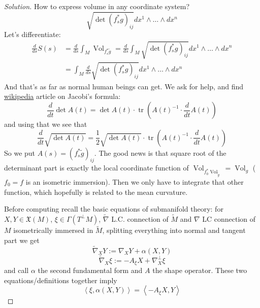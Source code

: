 \begin{proof}[Solution]\leavevmode
How to express volume in any coordinate system?
\[\sqrt{\det (f^* _sg)_{ij}}dx^1\wedge\ldots\wedge dx^n\]
Let's differentiate:
\begin{align*}
	\frac{d}{ds}S(s)&=\frac{d}{ds}\int_M\operatorname{Vol}_{f^*_s\tilde{g}}=\frac{d}{ds}\int_M \sqrt{\det (f^* _sg)_{ij}}dx^1\wedge\ldots\wedge dx^n\\
&=\int_M \frac{d}{ds}\sqrt{\det (f^* _sg)_{ij}}dx^1\wedge\ldots\wedge dx^n
\end{align*}
And that's as far as normal human beings can get. We ask for help, and find
\href{https://en.wikipedia.org/wiki/Jacobi%27s_formula}{wikipedia} article on Jacobi's formula:
	\[\boxed{\frac{d}{dt}\det A(t)=\det A(t) \cdot \operatorname{tr}\left(A(t)^{-1}\cdot \frac{d}{dt}A(t)\right)}\]
and using that we see that
\[\boxed{\frac{d}{dt}\sqrt{\det A(t)} =\frac{1}{2}\sqrt{\det A(t)} \cdot\operatorname{tr}\left(A(t)^{-1}\cdot \frac{d}{dt}A(t)\right) }\]
So we put \(A(s)=(f^*_s\tilde{g})_{ij}\). The good news is that square root of the determinant part is exactly the local coordinate function of \(\operatorname{Vol}_{f_0^*\operatorname{Vol}_{\tilde{g}}}=\operatorname{Vol}_g\) (\(f_0=f\) is an isometric immersion). Then we only have to integrate that other function, which hopefully is related to the mean curvature.

Before computing recall the basic equations of submanifold theory: for \(X,Y \in \mathfrak{X}(M)\), \(\xi \in \Gamma(T^\perp M)\), \(\tilde{\nabla}\) L.C. connection of \(\tilde{M}\) and \(\nabla\) LC connection of \(M\) isometrically immersed in  \(\tilde{M}\), splitting everything into normal and tangent part we get
\[\boxed{\tilde{\nabla}_XY:=\nabla_XY+\alpha(X,Y)}\]
\[\boxed{\tilde{\nabla}_X\xi:=-A_\xi X+\nabla^\perp_X\xi}\]
and call \(\alpha\) the second fundamental form and \(A\) the shape operator. These two equations/definitions together imply
\[\boxed{\left<\xi,\alpha(X,Y)\right>=\left<-A_\xi X,Y\right>}\]



\end{proof}
